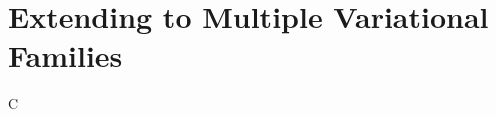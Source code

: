 

\section{Extending to Multiple Variational Families} \label{sec:extension}

C \cite{kingma2013auto}
